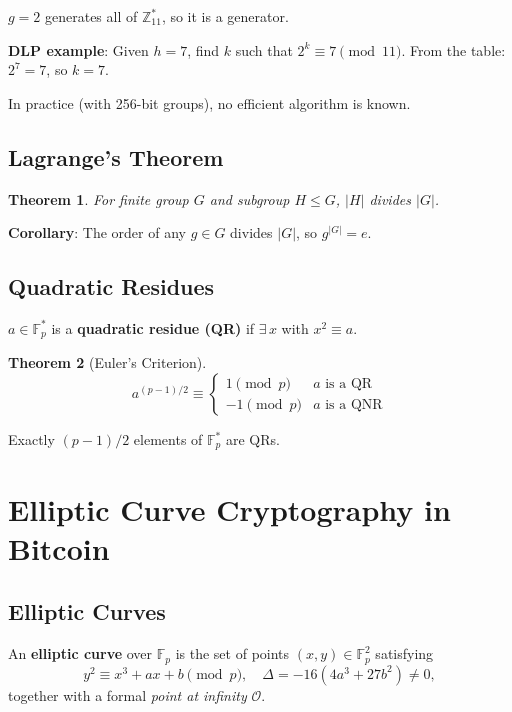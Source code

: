 \documentclass[12pt,a4paper,openany]{book}
\theoremstyle{definition}
\theoremstyle{plain}
\newtheorem{theorem}{Theorem}[chapter]
\theoremstyle{remark}
\begin{document}
$g=2$ generates all of $\mathbb{Z}_{11}^*$, so it is a generator.

\textbf{DLP example}: Given $h=7$, find $k$ such that $2^k\equiv 7\pmod{11}$.
From the table: $2^7=7$, so $k=7$.

In practice (with 256-bit groups), no efficient algorithm is known.

\section{Lagrange's Theorem}

\begin{theorem}
  For finite group $G$ and subgroup $H\leq G$, $|H|$ divides $|G|$.
\end{theorem}

\textbf{Corollary}: The order of any $g\in G$ divides $|G|$, so
$g^{|G|}=e$.

\section{Quadratic Residues}

$a\in\mathbb{F}_p^*$ is a \textbf{quadratic residue (QR)} if
$\exists\,x$ with $x^2\equiv a$.

\begin{theorem}[Euler's Criterion]
  \[
    a^{(p-1)/2}\equiv\begin{cases}1\pmod p & a \text{ is a QR}\\
    -1\pmod p & a \text{ is a QNR}\end{cases}
  \]
\end{theorem}

Exactly $(p-1)/2$ elements of $\mathbb{F}_p^*$ are QRs.


\chapter{Elliptic Curve Cryptography in Bitcoin}
\label{chap:ecc}

\section{Elliptic Curves}

\begin{definitionbox}
  An \textbf{elliptic curve} over $\mathbb{F}_p$ is the set of points
  $(x,y)\in\mathbb{F}_p^2$ satisfying
  \begin{equation}
    y^2 \equiv x^3+ax+b \pmod p, \quad \Delta=-16(4a^3+27b^2)\neq 0,
  \end{equation}
  together with a formal \emph{point at infinity} $\mathcal{O}$.
\end{definitionbox}
\end{document}
